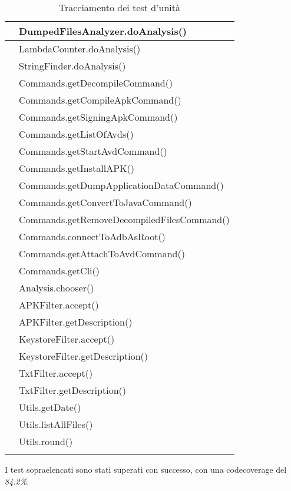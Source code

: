 \begin{longtable}{ |C{3cm} |C{10.5cm}|}
     & DumpedFilesAnalyzer.doAnalysis()           \\\hline
     & LambdaCounter.doAnalysis()                 \\\hline
     & StringFinder.doAnalysis()                  \\\hline
     & Commands.getDecompileCommand()             \\\hline
     & Commands.getCompileApkCommand()            \\\hline
     & Commands.getSigningApkCommand()            \\\hline
     & Commands.getListOfAvds()                   \\\hline
     & Commands.getStartAvdCommand()              \\\hline
     & Commands.getInstallAPK()                   \\\hline
     & Commands.getDumpApplicationDataCommand()   \\\hline
     & Commands.getConvertToJavaCommand()         \\\hline
     & Commands.getRemoveDecompiledFilesCommand() \\\hline
     & Commands.connectToAdbAsRoot()              \\\hline
     & Commands.getAttachToAvdCommand()           \\\hline
     & Commands.getCli()                          \\\hline
     & Analysis.chooser()                         \\\hline
     & APKFilter.accept()                         \\\hline
     & APKFilter.getDescription()                 \\\hline
     & KeystoreFilter.accept()                    \\\hline
     & KeystoreFilter.getDescription()            \\\hline
     & TxtFilter.accept()                         \\\hline
     & TxtFilter.getDescription()                 \\\hline
     & Utils.getDate()                            \\\hline
     & Utils.listAllFiles()                       \\\hline
     & Utils.round()                              \\\hline
    \caption{Tracciamento dei test d'unità}
\end{longtable}

I test sopraelencati sono stati superati con successo, con una \gls{codecoverage} del \textit{84.2\%}.
\newpage